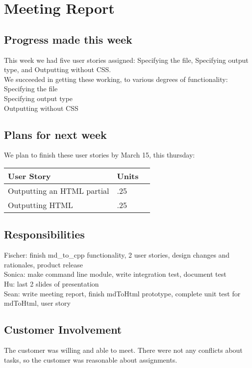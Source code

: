 \section{Meeting Report}

\subsection{Progress made this week}
This week we had five user stories assigned: Specifying the file, Specifying output type, and Outputting without CSS.\\
We succeeded in getting these working, to various degrees of functionality: \\
Specifying the file\\
Specifying output type\\
Outputting without CSS\\



\subsection{Plans for next week}
We plan to finish these user stories by March 15, this thursday:

 \begin{center}
    \begin{tabular}{ | l | l | p{5cm} |}
    \hline
    User Story & Units \\ \hline
    Outputting an HTML partial & .25 \\ \hline
    Outputting HTML & .25 \\ \hline
    \end{tabular}
\end{center}


\subsection{Responsibilities}
Fischer: finish md\_to\_cpp functionality, 2 user stories, design changes and rationales, product release  \\
Sonica: make command line module, write integration test, document test\\
Hu: last 2 slides of presentation \\
Sean: write meeting report, finish mdToHtml prototype, complete unit test for mdToHtml, user story\\

\subsection{Customer Involvement}
The customer was willing and able to meet.
There were not any conflicts about tasks, so the customer was reasonable about assignments.

